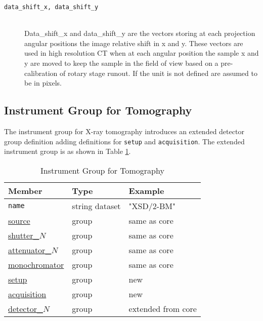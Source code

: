 \begin{description}
\item[ \tt{data\_shift\_x, data\_shift\_y}] \hfill \\
{Data\_shift\_x and data\_shift\_y are the vectors storing at each projection angular positions the image relative shift in x and y.  These vectors are used in high resolution CT when at each angular position the sample x and y are moved to keep the sample in the field of view based on a pre-calibration of rotary stage runout. If the unit is not defined are assumed to be in pixels.}

\end{description}

\subsection{Instrument Group for Tomography}
\label{tomo:instrument}
The instrument group for X-ray tomography introduces an extended detector group definition adding definitions for {\tt{setup}} and {\tt{acquisition}}. The extended instrument group is as shown in Table \ref{table:tomo:instrument}.

\begin{table}[h!]\sffamily \footnotesize
\centering
\caption{Instrument Group for Tomography}
\begin{tabular}{l l l}
\toprule
\bfseries Member     & \bfseries Type & \bfseries Example \\
\midrule
\tt{name} & string dataset & "XSD/2-BM" \\
\hyperref[table:source]{source} &  group & same as core\\
\hyperref[table:shutter]{shutter\_$N$}  &  group &  same as core\\
\hyperref[table:attenuator]{attenuator\_$N$} & group & same as core\\
\hyperref[table:monochromator]{monochromator} & group & same as core\\
\hyperref[table:tomo:setup]{setup} & group & new \\
\hyperref[table:tomo:acquisition]{acquisition} & group & new \\
\hyperref[table:tomo:detector]{detector\_$N$} & group & extended from core\\
\bottomrule
\end{tabular}
\label{table:tomo:instrument}
\end{table}

